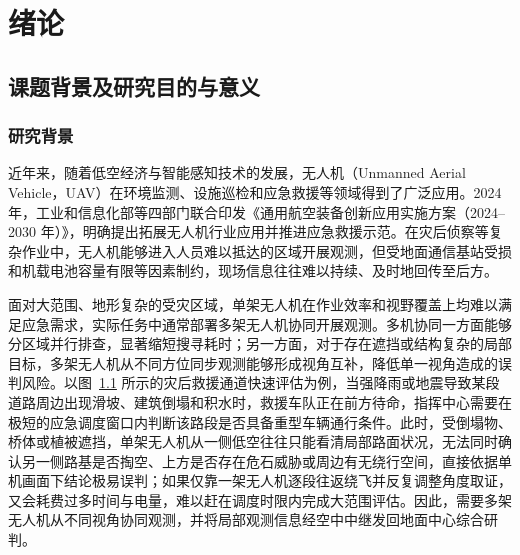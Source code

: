 \chapter{绪论}
\label{ch:introduction}

\section{课题背景及研究目的与意义}
\subsection{研究背景}

近年来，随着低空经济与智能感知技术的发展，无人机（Unmanned Aerial Vehicle，UAV）在环境监测、设施巡检和应急救援等领域得到了广泛应用\cite{shakhatreh2019civil}。2024 年，工业和信息化部等四部门联合印发《通用航空装备创新应用实施方案（2024--2030 年）》，明确提出拓展无人机行业应用并推进应急救援示范\cite{miit2024aviation}。在灾后侦察等复杂作业中，无人机能够进入人员难以抵达的区域开展观测，但受地面通信基站受损和机载电池容量有限等因素制约，现场信息往往难以持续、及时地回传至后方\cite{erdelj2017disaster}。

面对大范围、地形复杂的受灾区域，单架无人机在作业效率和视野覆盖上均难以满足应急需求，实际任务中通常部署多架无人机协同开展观测。多机协同一方面能够分区域并行排查，显著缩短搜寻耗时；另一方面，对于存在遮挡或结构复杂的局部目标，多架无人机从不同方位同步观测能够形成视角互补，降低单一视角造成的误判风险。以图~\ref{fig:intro:scenario} 所示的灾后救援通道快速评估为例，当强降雨或地震导致某段道路周边出现滑坡、建筑倒塌和积水时，救援车队正在前方待命，指挥中心需要在极短的应急调度窗口内判断该路段是否具备重型车辆通行条件。此时，受倒塌物、桥体或植被遮挡，单架无人机从一侧低空往往只能看清局部路面状况，无法同时确认另一侧路基是否掏空、上方是否存在危石威胁或周边有无绕行空间，直接依据单机画面下结论极易误判；如果仅靠一架无人机逐段往返绕飞并反复调整角度取证，又会耗费过多时间与电量，难以赶在调度时限内完成大范围评估。因此，需要多架无人机从不同视角协同观测，并将局部观测信息经空中中继发回地面中心综合研判。

\begin{figure}[H]
\centering

\label{fig:intro:scenario}
\end{figure}

